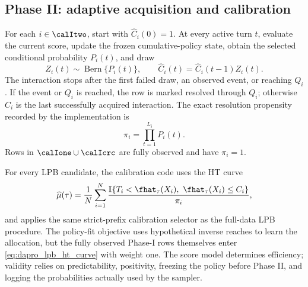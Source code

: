 \subsection{Phase II: adaptive acquisition and calibration}

For each $i\in\calItwo$, start with $\widehat C_i(0)=1$.  At every active turn
$t$, evaluate the current score, update the frozen cumulative-policy state,
obtain the selected conditional probability $P_i(t)$, and draw
\begin{equation}
    Z_i(t)\sim\operatorname{Bern}\{P_i(t)\},
    \qquad
    \widehat C_i(t)=\widehat C_i(t-1)Z_i(t).
\end{equation}
The interaction stops after the first failed draw, an observed event, or
reaching $Q_i$.  If the event or $Q_i$ is reached, the row is marked resolved
through $Q_i$; otherwise $C_i$ is the last successfully acquired interaction.
The exact resolution propensity recorded by the implementation is
\begin{equation}
    \pi_i
    =\prod_{t=1}^{L_i}P_i(t).
    \label{eq:dapro_lpb_logged_propensity}
\end{equation}
Rows in $\calIone\cup\calIcrc$ are fully observed and have $\pi_i=1$.

For every LPB candidate, the calibration code uses the HT curve
\begin{equation}
    \widehat\mu(\tau)
    =\frac{1}{N}\sum_{i=1}^{N}
      \frac{
        \mathbb I\{T_i<\fhat_\tau(X_i),\ \fhat_\tau(X_i)\leq C_i\}
      }{\pi_i},
    \label{eq:dapro_lpb_ht_curve}
\end{equation}
and applies the same strict-prefix calibration selector as the full-data LPB
procedure.  The policy-fit objective uses hypothetical inverse reaches to
learn the allocation, but the fully observed Phase-I rows themselves enter
\eqref{eq:dapro_lpb_ht_curve} with weight one.  The score model determines
efficiency; validity relies on predictability, positivity, freezing the policy
before Phase II, and logging the probabilities actually used by the sampler.
